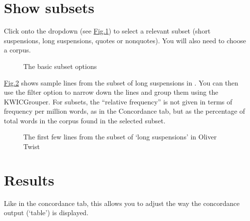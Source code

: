 \documentclass[letterpaper,10pt,english]{sphinxmanual}
\begin{document}
\section{Show subsets}
\label{\detokenize{clicanalysis/subsets:show-subsets}}
\sphinxAtStartPar
Click onto the dropdown  (see \hyperref[\detokenize{clicanalysis/subsets:figure-analysis-subsets-show-options}]{Fig.\@ \ref{\detokenize{clicanalysis/subsets:figure-analysis-subsets-show-options}}}) to select a relevant
subset (short suspensions, long suspensions, quotes or non\sphinxhyphen{}quotes). You
will also need to choose a corpus.

\begin{figure}[htbp]
\centering
\capstart

\noindent{}
\caption{The basic subset options}\label{\detokenize{clicanalysis/subsets:id2}}\label{\detokenize{clicanalysis/subsets:figure-analysis-subsets-show-options}}\end{figure}

\sphinxAtStartPar
\hyperref[\detokenize{clicanalysis/subsets:figure-analysis-subsets-show-longsuspensions}]{Fig.\@ \ref{\detokenize{clicanalysis/subsets:figure-analysis-subsets-show-longsuspensions}}} shows sample
lines from the subset of long suspensions in . You can
then use the filter option to narrow down the lines and group them using
the KWICGrouper. For subsets, the “relative frequency” is not given in terms of
frequency per million words, as in the Concordance tab, but as the percentage of
total words in the corpus found in the selected subset.

\begin{figure}[htbp]
\centering
\capstart

\noindent{}
\caption{The first few lines from the subset of ‘long suspensions’
in Oliver Twist}\label{\detokenize{clicanalysis/subsets:id3}}\label{\detokenize{clicanalysis/subsets:figure-analysis-subsets-show-longsuspensions}}\end{figure}


\section{Results}
\label{\detokenize{clicanalysis/subsets:results}}
\sphinxAtStartPar
Like in the concordance tab, this allows you to adjust the way the
concordance output (‘table’) is displayed.
\end{document}
